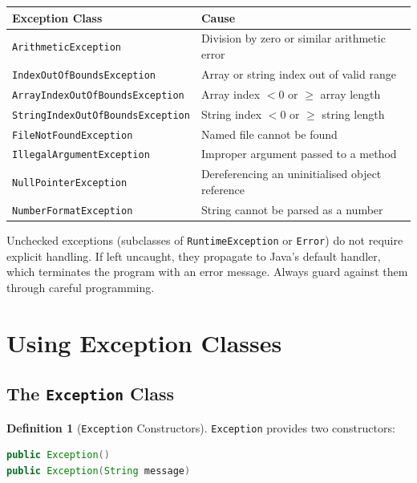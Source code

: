\documentclass[11pt, a4paper, notitlepage]{report}
\theoremstyle{definition}
\newtheorem{definition}[theorem]{Definition}
\theoremstyle{remark}
\theoremstyle{definition}
\begin{document}
\begin{center}
\begin{tabular}{ll}
\toprule
\textbf{Exception Class} & \textbf{Cause} \\
\midrule
\texttt{ArithmeticException} & Division by zero or similar arithmetic error \\
\texttt{IndexOutOfBoundsException} & Array or string index out of valid range \\
\texttt{ArrayIndexOutOfBoundsException} & Array index $< 0$ or $\geq$ array length \\
\texttt{StringIndexOutOfBoundsException} & String index $< 0$ or $\geq$ string length \\
\texttt{FileNotFoundException} & Named file cannot be found \\
\texttt{IllegalArgumentException} & Improper argument passed to a method \\
\texttt{NullPointerException} & Dereferencing an uninitialised object reference \\
\texttt{NumberFormatException} & String cannot be parsed as a number \\
\bottomrule
\end{tabular}
\end{center}

\begin{warning}[title={Warning: Unchecked Exceptions Are Still Dangerous}]
Unchecked exceptions (subclasses of \texttt{RuntimeException} or \texttt{Error}) do not require explicit handling. If left uncaught, they propagate to Java's default handler, which terminates the program with an error message. Always guard against them through careful programming.
\end{warning}

\section{Using Exception Classes}
\label{sec:ch4-using-exceptions}

\subsection{The \texttt{Exception} Class}
\label{sec:ch4-exception-class}

\begin{definition}[\texttt{Exception} Constructors]
\label{def:ch4-exception-constructors}
\texttt{Exception} provides two constructors:
\begin{lstlisting}[language=Java]
public Exception()
public Exception(String message)
\end{lstlisting}
\end{definition}
\end{document}

